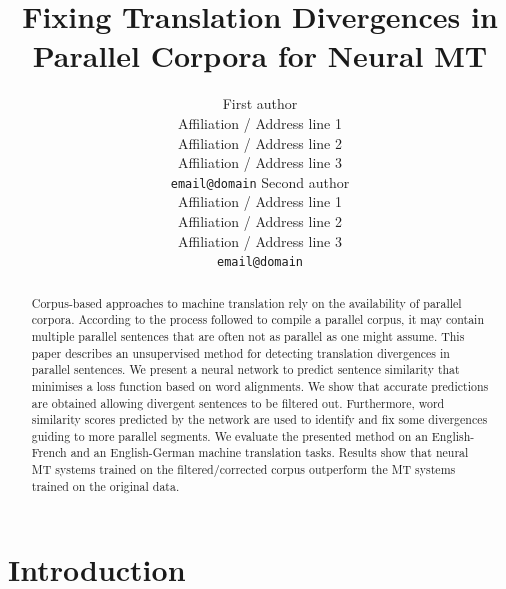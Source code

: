 \documentclass[11pt,a4paper]{article}
\title{Fixing Translation Divergences in Parallel Corpora for Neural MT}
\author{%
  First author\\
  Affiliation / Address line 1\\
  Affiliation / Address line 2\\
  Affiliation / Address line 3\\
  {\tt email@domain}  
  \And
  Second author\\
  Affiliation / Address line 1\\
  Affiliation / Address line 2\\
  Affiliation / Address line 3\\
  {\tt email@domain}}
\date{}
\begin{document}
\maketitle
\begin{abstract}


Corpus-based approaches to machine translation rely on the availability of parallel corpora.
According to the process followed to compile a parallel corpus, it may contain multiple parallel sentences that are often not as parallel as one might assume. 
This paper describes an unsupervised method for detecting translation divergences in parallel sentences. 
We present a neural network to predict sentence similarity that minimises a loss function based on word alignments.
We show that accurate predictions are obtained allowing divergent sentences to be filtered out. 
Furthermore, word similarity scores predicted by the network are used to identify and fix some divergences guiding to more parallel segments.
We evaluate the presented method on an English-French and an English-German machine translation tasks. 
Results show that neural MT systems trained on the filtered/corrected corpus outperform the MT systems trained on the original data.

\end{abstract}

\section{Introduction}
\end{document}
